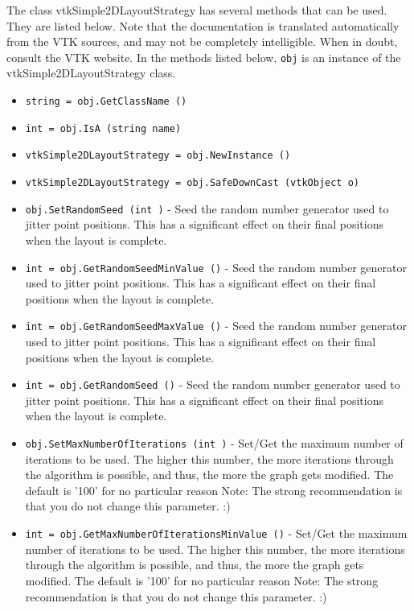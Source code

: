 The class vtkSimple2DLayoutStrategy has several methods that can be used.
  They are listed below.
Note that the documentation is translated automatically from the VTK sources,
and may not be completely intelligible.  When in doubt, consult the VTK website.
In the methods listed below, \verb|obj| is an instance of the vtkSimple2DLayoutStrategy class.
\begin{itemize}
\item  \verb|string = obj.GetClassName ()|

\item  \verb|int = obj.IsA (string name)|

\item  \verb|vtkSimple2DLayoutStrategy = obj.NewInstance ()|

\item  \verb|vtkSimple2DLayoutStrategy = obj.SafeDownCast (vtkObject o)|

\item  \verb|obj.SetRandomSeed (int )| -  Seed the random number generator used to jitter point positions.
 This has a significant effect on their final positions when
 the layout is complete.

\item  \verb|int = obj.GetRandomSeedMinValue ()| -  Seed the random number generator used to jitter point positions.
 This has a significant effect on their final positions when
 the layout is complete.

\item  \verb|int = obj.GetRandomSeedMaxValue ()| -  Seed the random number generator used to jitter point positions.
 This has a significant effect on their final positions when
 the layout is complete.

\item  \verb|int = obj.GetRandomSeed ()| -  Seed the random number generator used to jitter point positions.
 This has a significant effect on their final positions when
 the layout is complete.

\item  \verb|obj.SetMaxNumberOfIterations (int )| -  Set/Get the maximum number of iterations to be used.
 The higher this number, the more iterations through the algorithm
 is possible, and thus, the more the graph gets modified.
 The default is '100' for no particular reason
 Note: The strong recommendation is that you do not change
 this parameter. :)

\item  \verb|int = obj.GetMaxNumberOfIterationsMinValue ()| -  Set/Get the maximum number of iterations to be used.
 The higher this number, the more iterations through the algorithm
 is possible, and thus, the more the graph gets modified.
 The default is '100' for no particular reason
 Note: The strong recommendation is that you do not change
 this parameter. :)


\end{itemize}
